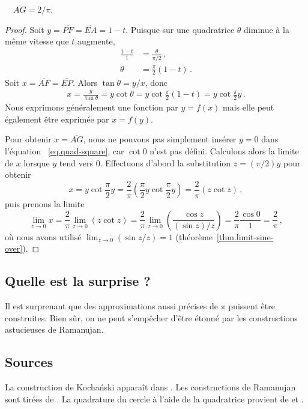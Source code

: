 \begin{theorem}
$\quad\overline{AG}=2/\pi$.
\end{theorem}

\begin{proof}
Soit  $y=\overline{PF}=\overline{EA}=1-t$. Puisque sur une quadratrice $\theta$ diminue à la même vitesse que $t$ augmente,
\begin{align*}
\frac{1-t}{1} &= \frac{\theta}{\pi/2}\,,\\
\theta &=\frac{\pi}{2}(1-t)\,.
\end{align*}
Soit  $x=\overline{AF}=\overline{EP}$. Alors $\tan \theta = y/x$, donc 
\begin{align}\label{eq.quad-square}
x = \frac{y}{\tan\theta}=y\cot\theta=y\cot \frac{\pi}{2}(1-t)=y\cot \frac{\pi}{2}y\,.
\end{align}
Nous exprimons généralement une fonction par $y=f(x)$ mais elle peut également être exprimée par $x=f(y)$. 

Pour obtenir $x=\overline{AG}$, nous ne pouvons pas simplement insérer $y=0$ dans l'équation ~\ref{eq.quad-square}, car $\cot 0$ n'est pas défini.  Calculons alors la limite de $x$ lorsque $y$ tend vers $0$. 
Effectuons d'abord la substitution $z=(\pi/2)y$ pour obtenir 
\[
x = y\cot \frac{\pi}{2}y = \frac{2}{\pi} \left(\frac{\pi}{2}y\cot \frac{\pi}{2}y\right)=\frac{2}{\pi}(z\cot z)\,,
\]
puis prenons la limite 
\[
\lim_{z\rightarrow 0} x=\frac{2}{\pi}\lim_{z\rightarrow 0} (z\cot z) = \frac{2}{\pi}\lim_{z\rightarrow 0} \left(\frac{\cos z}{(\sin z)/z}\right) = \frac{2}{\pi}\frac{\cos 0}{1} = \frac{2}{\pi}\,,
\]
où nous avons utilisé 
 $\lim_{z\rightarrow 0} (\sin z/z)=1$ (théorème~\ref{thm.limit-sine-over}).
\end{proof}

\subsection*{Quelle est la surprise ?}

Il est surprenant que des approximations aussi précises de $\pi$ puissent être construites. Bien sûr, on ne peut s'empêcher d'être étonné par les constructions astucieuses de Ramanujan.

\subsection*{Sources}
La construction de Kocha\'{n}ski apparaît dans \cite{bold}. Les constructions de Ramanujan sont tirées de \cite{ramanujan1,ramanujan2}. La quadrature du cercle à l'aide de la  quadratrice provient de \cite[p.~48--49]{martin} et \cite{wiki:quad}.
